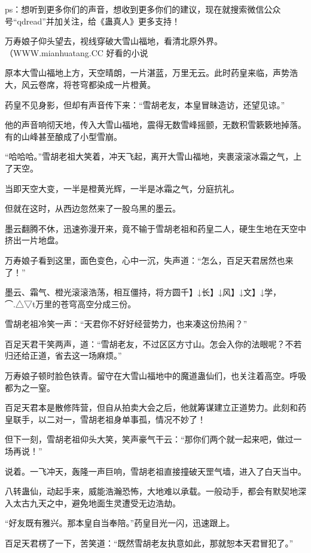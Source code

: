 
\begin{this_body}

ps：想听到更多你们的声音，想收到更多你们的建议，现在就搜索微信公众号“qdread”并加关注，给《蛊真人》更多支持！

万寿娘子仰头望去，视线穿破大雪山福地，看清北原外界。（WWW.mianhuatang.CC 好看的小说

原本大雪山福地上方，天空晴朗，一片湛蓝，万里无云。此时药皇来临，声势浩大，风云卷席，将苍穹都染成一片橙黄。

药皇不见身影，但却有声音传下来：“雪胡老友，本皇冒昧造访，还望见谅。”

他的声音响彻天地，传入大雪山福地，震得无数雪峰摇颤，无数积雪簌簌地掉落。有的山峰甚至酿成了小型雪崩。

“哈哈哈。”雪胡老祖大笑着，冲天飞起，离开大雪山福地，夹裹滚滚冰霜之气，上了天空。

当即天空大变，一半是橙黄光辉，一半是冰霜之气，分庭抗礼。

但就在这时，从西边忽然来了一股乌黑的墨云。

墨云翻腾不休，迅速弥漫开来，竟不输于雪胡老祖和药皇二人，硬生生地在天空中挤出一片地盘。

万寿娘子看到这里，面色变色，心中一沉，失声道：“怎么，百足天君居然也来了！”

墨云、霜气、橙光滚滚浩荡，相互僵持，将方圆千】↓长】↓风】↓文】↓学，⌒.△▽t万里的苍穹高空分成三份。

雪胡老祖冷笑一声：“天君你不好好经营势力，也来凑这份热闹？”

百足天君干笑两声，道：“雪胡老友，不过区区方寸山。怎会入你的法眼呢？不若归还给正道，省去这一场麻烦。”

万寿娘子顿时脸色铁青。留守在大雪山福地中的魔道蛊仙们，也关注着高空。呼吸都为之一窒。

百足天君本是散修阵营，但自从拍卖大会之后，他就筹谋建立正道势力。此刻和药皇联手，以二对一，雪胡老祖身单事孤，情况不妙了！

但下一刻，雪胡老祖仰头大笑，笑声豪气干云：“那你们两个就一起来吧，做过一场再说！”

说着。一飞冲天，轰隆一声巨响，雪胡老祖直接撞破天罡气墙，进入了白天当中。

八转蛊仙，动起手来，威能浩瀚恐怖，大地难以承载。一般动手，都会有默契地深入太古九天之中，避免地面生灵遭受无边浩劫。

“好友既有雅兴。那本皇自当奉陪。”药皇目光一闪，迅速跟上。

百足天君楞了一下，苦笑道：“既然雪胡老友执意如此，那就恕本天君冒犯了。”


\end{this_body}
